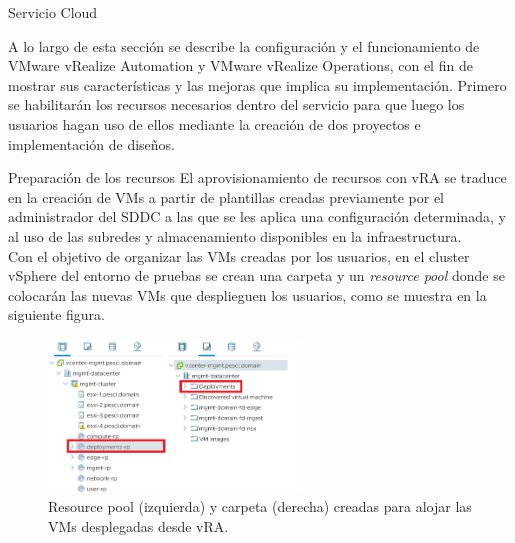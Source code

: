 \begin{subsection}{Servicio Cloud}
\label{subsec:plataforma-cloud}
    
    A lo largo de esta sección se describe la configuración y el funcionamiento de VMware vRealize Automation y VMware vRealize Operations, con el fin de mostrar sus características y las mejoras que implica su implementación. Primero se habilitarán los recursos necesarios dentro del servicio para que luego los usuarios hagan uso de ellos mediante la creación de dos proyectos e implementación de diseños. 

    \begin{subsubsection}{Preparación de los recursos}
    El aprovisionamiento de recursos con vRA se traduce en la creación de VMs a partir de plantillas creadas previamente por el administrador del SDDC a las que se les aplica una configuración determinada, y al uso de las subredes y almacenamiento disponibles en la infraestructura. 
    \\
    Con el objetivo de organizar las VMs creadas por los usuarios, en el cluster vSphere del entorno de pruebas se crean una carpeta y un \textit{resource pool} donde se colocarán las nuevas VMs que desplieguen los usuarios, como se muestra en la siguiente figura.
    \begin{figure}[h]
        \centering
        \includegraphics[width=0.6\textwidth]{imaxes/pruebaconcepto/vrealize/rp-vra.png}
        \caption{Resource pool (izquierda) y carpeta (derecha) creadas para alojar las VMs desplegadas desde vRA.}
        \label{fig:rp-folder-vra}
    \end{figure}
    \FloatBarrier

\end{subsubsection}
\end{subsection}
